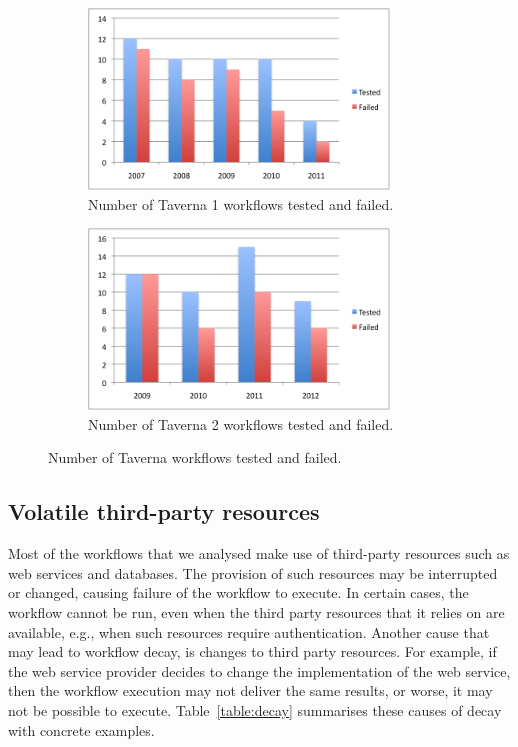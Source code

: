 \begin{figure}[h]
  \centering
  \begin{subfigure}[t]{8.25cm}
    \centering
    \includegraphics[width=8cm]{./Figures/taverna1-workflows-rate.png}
    \caption{Number of Taverna 1 workflows tested and failed.}
  \end{subfigure}
  \begin{subfigure}[t]{8.25cm}
    \centering
    \includegraphics[width=8cm]{./Figures/taverna2-workflows-rate.png}
    \caption{Number of Taverna 2 workflows tested and failed.}
  \end{subfigure}
  \caption{Number of Taverna workflows tested and failed.}
  \label{fig:taverna-wf-failed}
\end{figure}



\subsection{Volatile third-party resources}
Most of the workflows that we analysed make use of third-party resources such as web services and databases.
The provision of such resources may be interrupted or changed, causing failure of the workflow to execute. In certain cases, the workflow cannot be run, even when the third party resources that it relies on are available, e.g.,  when such resources require authentication. Another cause that may lead to workflow decay, is changes to third party resources. For example, if the web service provider decides to change the implementation of the web service, then the workflow execution may not deliver the same results, or worse, it may not be possible to execute. Table~\ref{table:decay} summarises these causes of decay with concrete examples.


